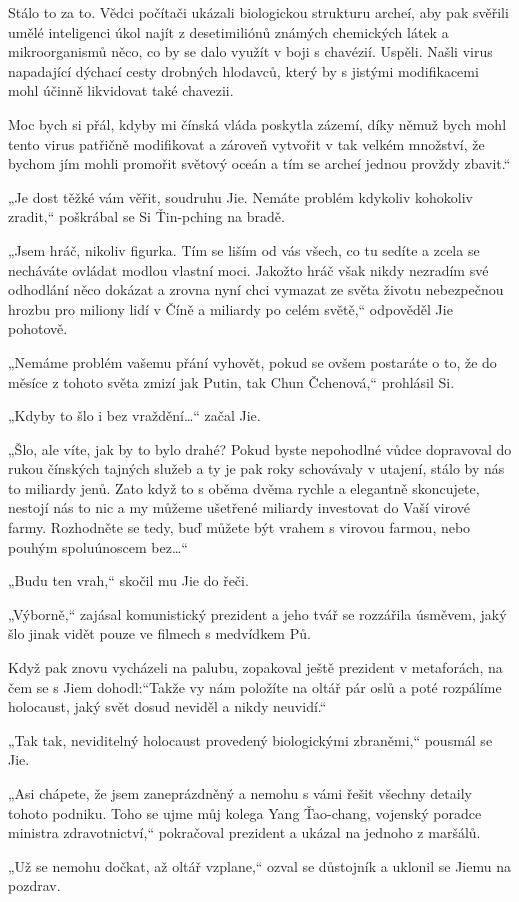 {Stálo to za to. Vědci počítači ukázali biologickou strukturu archeí, aby pak svěřili umělé inteligenci úkol najít z desetimiliónů známých chemických látek a mikroorganismů něco, co by se dalo využít v boji s chavézií. Uspěli. Našli virus napadající dýchací cesty drobných hlodavců, který by s jistými modifikacemi mohl účinně likvidovat také chavezii.

Moc bych si přál, kdyby mi čínská vláda poskytla zázemí, díky němuž bych mohl tento virus patřičně modifikovat a zároveň vytvořit v tak velkém množství, že bychom jím mohli promořit světový oceán a tím se archeí jednou provždy zbavit.“

„Je dost těžké vám věřit, soudruhu Jie. Nemáte problém kdykoliv kohokoliv zradit,“ poškrábal se Si Ťin-pching na bradě.

„Jsem hráč, nikoliv figurka. Tím se liším od vás všech, co tu sedíte a zcela se necháváte ovládat modlou vlastní moci. Jakožto hráč však nikdy nezradím své odhodlání něco dokázat a zrovna nyní chci vymazat ze světa životu nebezpečnou hrozbu pro miliony lidí v Číně a miliardy po celém světě,“ odpověděl Jie pohotově.

„Nemáme problém vašemu přání vyhovět, pokud se ovšem postaráte o to, že do měsíce z tohoto světa zmizí jak Putin, tak Chun Čchenová,“ prohlásil Si.

„Kdyby to šlo i bez vraždění…“ začal Jie.

„Šlo, ale víte, jak by to bylo drahé? Pokud byste nepohodlné vůdce dopravoval do rukou čínských tajných služeb a ty je pak roky schovávaly v utajení, stálo by nás to miliardy jenů. Zato když to s oběma dvěma rychle a elegantně skoncujete, nestojí nás to nic a my můžeme ušetřené miliardy investovat do Vaší virové farmy. Rozhodněte se tedy, buď můžete být vrahem s virovou farmou, nebo pouhým spoluúnoscem bez…“

„Budu ten vrah,“ skočil mu Jie do řeči.

„Výborně,“ zajásal komunistický prezident a jeho tvář se rozzářila úsměvem, jaký šlo jinak vidět pouze ve filmech s medvídkem Pů.

Když pak znovu vycházeli na palubu, zopakoval ještě prezident v metaforách, na čem se s Jiem dohodl:“Takže vy nám položíte na oltář pár oslů a poté rozpálíme holocaust, jaký svět dosud neviděl a nikdy neuvidí.“ 

„Tak tak, neviditelný holocaust provedený biologickými zbraněmi,“ pousmál se Jie.

„Asi chápete, že jsem zaneprázdněný a nemohu s vámi řešit všechny detaily tohoto podniku. Toho se ujme můj kolega Yang Ťao-chang, vojenský poradce ministra zdravotnictví,“ pokračoval prezident a ukázal na jednoho z maršálů.

„Už se nemohu dočkat, až oltář vzplane,“ ozval se důstojník a uklonil se Jiemu na pozdrav.
}
\vspace{0.75cm}

